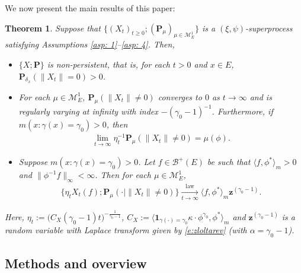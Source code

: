 \documentclass[12pt,a4paper]{amsart}
\newtheorem{thm}{Theorem}[section]
\theoremstyle{definition}
\numberwithin{equation}{section}
\begin{document}
We now present the main results of this paper:
\begin{thm} 
\label{thm: main theorem}
  Suppose that $\{(X_t)_{t\geq 0}; (\mathbf P_\mu)_{\mu \in \mathcal M_E^1}\}$ is a $(\xi, \psi)$-superprocess satisfying Assumptions \ref{asp: 1}--\ref{asp: 4}.
  Then,
  \begin{itemize}
  \item[(1)]
    $\{X; \mathbf P\}$ is non-persistent, that is, for each $t > 0$ and $x\in E$,
    $\mathbf P_{\delta_x}( \| X_t\| = 0) > 0$.
  \item[(2)]
    For each $\mu \in \mathcal M^1_E$, $\mathbf P_{\mu}(\|X_t\| \neq 0)$ converges to $0$ as $t \to \infty$ and is regularly varying at infinity with index $-(\gamma_0-1)^{-1}$.
    Furthermore, if $m(x: \gamma (x)= \gamma_0)>0$, then
    \begin{align}
      \lim_{t\to\infty} \eta_t^{-1}\mathbf P_{\mu}(\|X_t\| \neq 0)
      =\mu(\phi).
    \end{align}
  \item[(3)]
    Suppose $m( x:\gamma(x)=\gamma_0 )>0$.
    Let $f \in \mathscr B^+(E)$ be such that $\langle f, \phi^* \rangle_m > 0$ and $\| \phi^{-1}f \|_\infty < \infty$. Then for each $\mu \in \mathcal M_E^1$,
    \begin{align}
      \{\eta_t X_t(f) ; \mathbf P_{\mu}(\cdot |\|X_t\| \neq 0) \}
      \xrightarrow[t\to \infty]{\operatorname{law}} \langle f, \phi^*\rangle_m \mathbf z^{(\gamma_0 - 1)}.
    \end{align}
  \end{itemize}
  Here, $\eta_t := \big( C_X(\gamma_0 - 1) t \big)^{- \frac {1} {\gamma_0 - 1} }$, $C_X := \langle \mathbf 1_{\gamma(\cdot) = \gamma_0} \kappa\cdot \phi^{\gamma_0}, \phi^* \rangle_m$ and $\mathbf z^{(\gamma_0 - 1)}$ is a random variable with Laplace transform given by \eqref{e:zloltarev} 
  (with $\alpha=\gamma_0 -1$).
\end{thm}

\subsection{Methods and overview}
	
\end{document}
